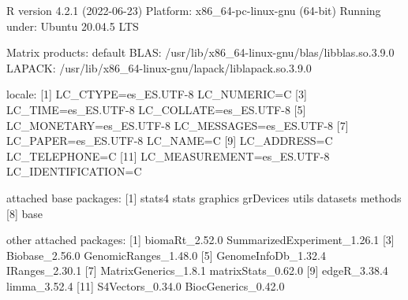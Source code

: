 \documentclass[
]{article}
\newenvironment{Shaded}{\begin{snugshade}}{\end{snugshade}}
\newcommand{\NormalTok}[1]{#1}
\begin{document}
\begin{Shaded}
\begin{Highlighting}[]
\NormalTok{R version 4.2.1 (2022{-}06{-}23)}
\NormalTok{Platform: x86\_64{-}pc{-}linux{-}gnu (64{-}bit)}
\NormalTok{Running under: Ubuntu 20.04.5 LTS}

\NormalTok{Matrix products: default}
\NormalTok{BLAS:   /usr/lib/x86\_64{-}linux{-}gnu/blas/libblas.so.3.9.0}
\NormalTok{LAPACK: /usr/lib/x86\_64{-}linux{-}gnu/lapack/liblapack.so.3.9.0}

\NormalTok{locale:}
\NormalTok{ [1] LC\_CTYPE=es\_ES.UTF{-}8       LC\_NUMERIC=C              }
\NormalTok{ [3] LC\_TIME=es\_ES.UTF{-}8        LC\_COLLATE=es\_ES.UTF{-}8    }
\NormalTok{ [5] LC\_MONETARY=es\_ES.UTF{-}8    LC\_MESSAGES=es\_ES.UTF{-}8   }
\NormalTok{ [7] LC\_PAPER=es\_ES.UTF{-}8       LC\_NAME=C                 }
\NormalTok{ [9] LC\_ADDRESS=C               LC\_TELEPHONE=C            }
\NormalTok{[11] LC\_MEASUREMENT=es\_ES.UTF{-}8 LC\_IDENTIFICATION=C       }

\NormalTok{attached base packages:}
\NormalTok{[1] stats4    stats     graphics  grDevices utils     datasets  methods  }
\NormalTok{[8] base     }

\NormalTok{other attached packages:}
\NormalTok{ [1] biomaRt\_2.52.0              SummarizedExperiment\_1.26.1}
\NormalTok{ [3] Biobase\_2.56.0              GenomicRanges\_1.48.0       }
\NormalTok{ [5] GenomeInfoDb\_1.32.4         IRanges\_2.30.1             }
\NormalTok{ [7] MatrixGenerics\_1.8.1        matrixStats\_0.62.0         }
\NormalTok{ [9] edgeR\_3.38.4                limma\_3.52.4               }
\NormalTok{[11] S4Vectors\_0.34.0            BiocGenerics\_0.42.0        }


\end{Highlighting}
\end{Shaded}
\end{document}
